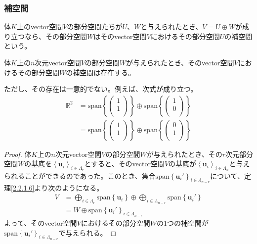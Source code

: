 \documentclass[dvipdfmx]{jsarticle}
\begin{document}
\subsubsection{補空間}%
\begin{dfn}
体$K$上のvector空間$V$の部分空間たちが$U$、$W$と与えられたとき、$V = U \oplus W$が成り立つなら、その部分空間$W$はそのvector空間$V$におけるその部分空間$U$の補空間という。
\end{dfn}
\begin{thm}\label{2.2.1.11}
体$K$上の$n$次元vector空間$V$の部分空間$W$が与えられたとき、そのvector空間$V$におけるその部分空間$W$の補空間は存在する。
\end{thm}\par
ただし、その存在は一意的でない。例えば、次式が成り立つ。
\begin{align*}
\mathbb{R}^{2} &= {\mathrm{span} }\left\{ \begin{pmatrix}
1 \\
1 \\
\end{pmatrix} \right\} \oplus {\mathrm{span} }\left\{ \begin{pmatrix}
1 \\
0 \\
\end{pmatrix} \right\}\\
&= {\mathrm{span} }\left\{ \begin{pmatrix}
1 \\
1 \\
\end{pmatrix} \right\} \oplus {\mathrm{span} }\left\{ \begin{pmatrix}
0 \\
1 \\
\end{pmatrix} \right\}
\end{align*}
\begin{proof}
体$K$上の$n$次元vector空間$V$の部分空間$W$が与えられたとき、その$r$次元部分空間$W$の基底を$\left\langle \mathbf{u}_{i} \right\rangle_{i \in \varLambda_{r}}$とすると、そのvector空間$V$の基底が$\left\langle \mathbf{u}_{i} \right\rangle_{i \in \varLambda_{n}}$と与えられることができるのであった。このとき、集合${\mathrm{span} }\left\{ \mathbf{u}_{i}' \right\}_{i \in \varLambda_{n - r}}$について、定理\ref{2.2.1.6}より次のようになる。
\begin{align*}
V &= \bigoplus_{i \in \varLambda_{r}} {{\mathrm{span} }\left\{ \mathbf{u}_{i} \right\}} \oplus \bigoplus_{i \in \varLambda_{n - r}} {{\mathrm{span} }\left\{ \mathbf{u}_{i}' \right\}}\\
&= W \oplus {\mathrm{span} }\left\{ \mathbf{u}_{i}' \right\}_{i \in \varLambda_{n - r}}
\end{align*}
よって、そのvector空間$V$におけるその部分空間$W$の1つの補空間が${\mathrm{span} }\left\{ \mathbf{u}_{i}' \right\}_{i \in \varLambda_{n - r}}$で与えられる。
\end{proof}
\end{document}
